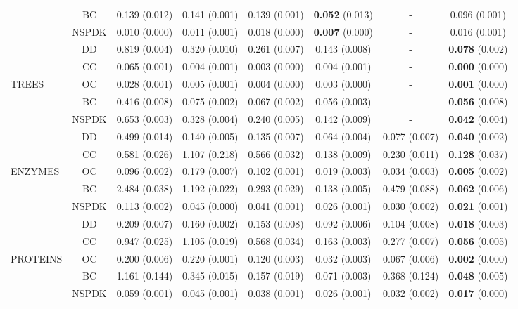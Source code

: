 \begin{table}
\begin{tabular}{lccccccc}
          & BC             & 0.139 (0.012) & 0.141 (0.001) & 0.139 (0.001) & \textbf{0.052} (0.013) & - & 0.096 (0.001)\\
          & NSPDK          & 0.010 (0.000) & 0.011 (0.001) & 0.018 (0.000) & \textbf{0.007} (0.000) & - & 0.016 (0.001)\\
        \midrule
          & DD             & 0.819 (0.004) & 0.320 (0.010) & 0.261 (0.007) & 0.143 (0.008) & - & \textbf{0.078} (0.002)\\
          & CC             & 0.065 (0.001) & 0.004 (0.001) & 0.003 (0.000) & 0.004 (0.001) & - & \textbf{0.000} (0.000)\\
TREES     & OC             & 0.028 (0.001) & 0.005 (0.001) & 0.004 (0.000) & 0.003 (0.000) & - & \textbf{0.001} (0.000)\\
          & BC             & 0.416 (0.008) & 0.075 (0.002) & 0.067 (0.002) & 0.056 (0.003) & - & \textbf{0.056} (0.008)\\
          & NSPDK          & 0.653 (0.003) & 0.328 (0.004) & 0.240 (0.005) & 0.142 (0.009) & - & \textbf{0.042} (0.004)\\
        \midrule
          & DD             & 0.499 (0.014) & 0.140 (0.005) & 0.135 (0.007) & 0.064 (0.004) & 0.077 (0.007) & \textbf{0.040} (0.002)\\
          & CC             & 0.581 (0.026) & 1.107 (0.218) & 0.566 (0.032) & 0.138 (0.009) & 0.230 (0.011) & \textbf{0.128} (0.037)\\
ENZYMES   & OC             & 0.096 (0.002) & 0.179 (0.007) & 0.102 (0.001) & 0.019 (0.003) & 0.034 (0.003) & \textbf{0.005} (0.002)\\
          & BC             & 2.484 (0.038) & 1.192 (0.022) & 0.293 (0.029) & 0.138 (0.005) & 0.479 (0.088) & \textbf{0.062} (0.006)\\
          & NSPDK          & 0.113 (0.002) & 0.045 (0.000) & 0.041 (0.001) & 0.026 (0.001) & 0.030 (0.002) & \textbf{0.021} (0.001)\\
        \midrule
          & DD             & 0.209 (0.007) & 0.160 (0.002) & 0.153 (0.008) & 0.092 (0.006) & 0.104 (0.008) & \textbf{0.018} (0.003)\\
          & CC             & 0.947 (0.025) & 1.105 (0.019) & 0.568 (0.034) & 0.163 (0.003) & 0.277 (0.007) & \textbf{0.056} (0.005)\\
PROTEINS  & OC             & 0.200 (0.006) & 0.220 (0.001) & 0.120 (0.003) & 0.032 (0.003) & 0.067 (0.006) & \textbf{0.002} (0.000)\\
          & BC             & 1.161 (0.144) & 0.345 (0.015) & 0.157 (0.019) & 0.071 (0.003) & 0.368 (0.124) & \textbf{0.048} (0.005)\\
          & NSPDK          & 0.059 (0.001) & 0.045 (0.001) & 0.038 (0.001) & 0.026 (0.001) & 0.032 (0.002) & \textbf{0.017} (0.000)\\
        \bottomrule
    \end{tabular}
\end{table}